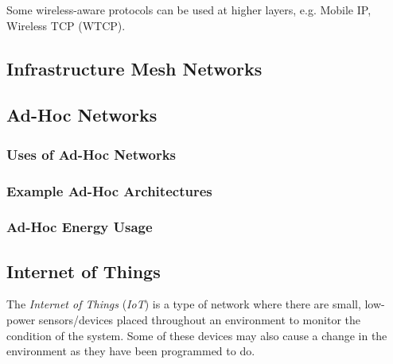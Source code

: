 \begin{remark*}
  Some wireless-aware protocols can be used at higher layers, e.g. Mobile IP, Wireless TCP (WTCP).
\end{remark*}

\subsection{Infrastructure Mesh Networks}\label{subsec:Infrastructure_Mesh_Networks}

\subsection{Ad-Hoc Networks}\label{subsec:Ad_Hoc_Networks}
\subsubsection{Uses of Ad-Hoc Networks}\label{subsubsec:Uses_Ad_Hoc_Network}
\subsubsection{Example Ad-Hoc Architectures}\label{subsubsec:Ad_Hoc_Architectures}
\subsubsection{Ad-Hoc Energy Usage}\label{subsubsec:Ad_Hoc_Architectures}

\subsection{Internet of Things}\label{subsec:IoT}
\begin{definition}\label{def:IoT}
  The \emph{Internet of Things} (\emph{IoT}) is a type of network where there are small, low-power sensors/devices placed throughout an environment to monitor the condition of the system.
  Some of these devices may also cause a change in the environment as they have been programmed to do.
\end{definition}

